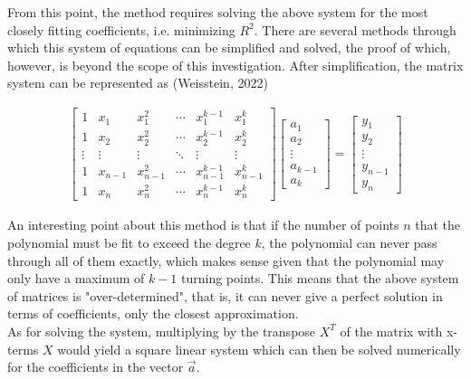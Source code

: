 \documentclass[12pt, a4paper]{article}
\begin{document}
From this point, the method requires solving the above system for the most
closely fitting coefficients, i.e. minimizing $R^2$. There are several methods
through which this system of equations can be simplified and solved, the proof
of which, however, is beyond the scope of this investigation. After
simplification, the matrix system can be represented as (Weisstein, 2022)

\begin{align*}
    \begin{bmatrix}
        1      & x_1     & x_1^2     & \cdots & x_1^{k-1}     & x_1^k     \\
        1      & x_2     & x_2^2     & \cdots & x_2^{k-1}     & x_2^k     \\
        \vdots & \vdots  & \vdots    & \ddots & \vdots        & \vdots    \\
        1      & x_{n-1} & x_{n-1}^2 & \cdots & x_{n-1}^{k-1} & x_{n-1}^k \\
        1      & x_n     & x_n^2     & \cdots & x_n^{k-1}     & x_n^k
    \end{bmatrix}
    \begin{bmatrix}
        a_1 \\ a_2 \\ \vdots \\ a_{k-1} \\ a_k
    \end{bmatrix}
    =
    \begin{bmatrix}
        y_1 \\ y_2 \\ \vdots \\ y_{n-1} \\ y_n
    \end{bmatrix}
\end{align*}

An interesting point about this method is that if the number of points $n$ that
the polynomial must be fit to exceed the degree $k$, the polynomial can never
pass through all of them exactly, which makes sense given that the polynomial
may only have a maximum of $k-1$ turning points. This means that the above
system of matrices is "over-determined", that is, it can never give a perfect
solution in terms of coefficients, only the closest approximation. \\

As for solving the system, multiplying by the transpose $X^T$ of the matrix with
x-terms $X$ would yield a square linear system which can then be solved
numerically for the coefficients in the vector $\vec{a}$.
\end{document}
